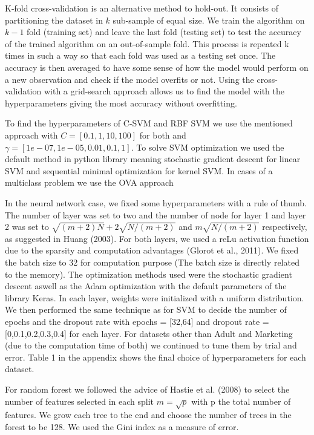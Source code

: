 \documentclass[a4paper,12pt]{article}
\numberwithin{equation}{section}
\begin{document}
K-fold cross-validation is an alternative method to hold-out. It consists of partitioning the dataset in $k$ sub-sample of equal size. We train the algorithm on $k-1$ fold (training set) and leave the last fold (testing set) to test the accuracy of the trained algorithm on an out-of-sample fold. This process is repeated k times in such a way so that each fold was used as a testing set once. The accuracy is then averaged to have some sense of how the model would perform on a new observation and check if the model overfits or not. Using the cross-validation with a grid-search approach allows us to find the model with the hyperparameters giving the most accuracy without overfitting.

To find the hyperparameters of C-SVM and RBF SVM we use the mentioned approach with $C = [0.1,1,10,100]$ for both and $ \gamma = [1e-07, 1e-05, 0.01, 0.1, 1] $. To solve SVM optimization we used the default method in python library meaning stochastic gradient descent for linear SVM and sequential minimal optimization for kernel SVM. In cases of a multiclass problem we use the OVA approach

In the neural network case, we fixed some hyperparameters with a rule of thumb. The number of layer was set to two and the number of node for layer 1 and layer 2 was set to $\sqrt{(m+2)N} + 2\sqrt{N/(m+2)}$ and $m\sqrt{N/(m+2)}$ respectively, as suggested in Huang (2003). For both layers, we used a reLu activation function due to the sparsity and computation advantages (Glorot et al., 2011). We fixed the batch size to 32 for computation purpose (The batch size is directly related to the memory). The optimization methods used were the stochastic gradient descent aswell as the Adam optimization with the default parameters of the library Keras. In each layer, weights were initialized with a uniform distribution. We then performed the same technique as for SVM to decide the number of epochs and the dropout rate with epochs = [32,64] and dropout rate = [0,0.1,0.2,0.3,0.4] for each layer. For datasets other than Adult and Marketing (due to the computation time of both) we continued to tune them by trial and error. Table 1 in the appendix shows the final choice of hyperparameters for each dataset.

For random forest we followed the advice of Hastie et al. (2008) to select the number of features selected in each split $m = \sqrt{p}$ with p the total number of features. We grow each tree to the end and choose the number of trees in the forest to be 128. We used the Gini index as a measure of error. 
\end{document}
